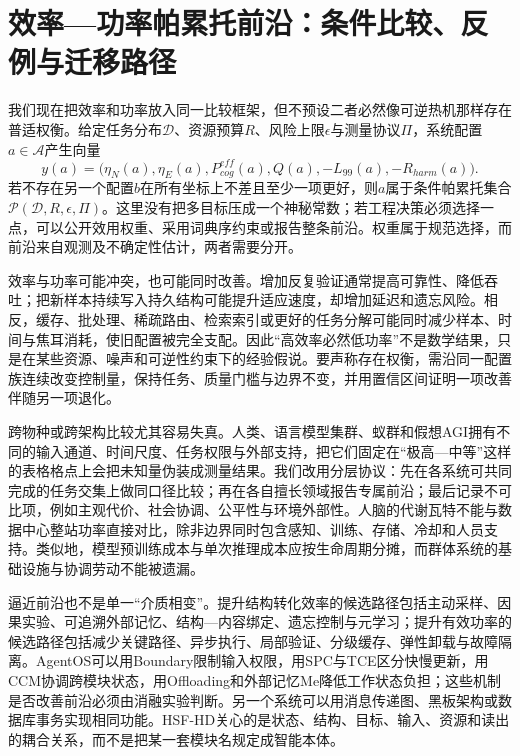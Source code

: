 \section{效率—功率帕累托前沿：条件比较、反例与迁移路径}
\label{sec:pareto_frontier}

我们现在把效率和功率放入同一比较框架，但不预设二者必然像可逆热机那样存在普适权衡。给定任务分布$\mathcal{D}$、资源预算$R$、风险上限$\epsilon$与测量协议$\Pi$，系统配置$a\in\mathcal{A}$产生向量
\begin{equation}
y(a)=\bigl(\eta_N(a),\eta_E(a),P_{cog}^{eff}(a),Q(a),-L_{99}(a),-R_{harm}(a)\bigr).
\end{equation}
若不存在另一个配置$b$在所有坐标上不差且至少一项更好，则$a$属于条件帕累托集合$\mathcal{P}(\mathcal{D},R,\epsilon,\Pi)$。这里没有把多目标压成一个神秘常数；若工程决策必须选择一点，可以公开效用权重、采用词典序约束或报告整条前沿。权重属于规范选择，而前沿来自观测及不确定性估计，两者需要分开。

效率与功率可能冲突，也可能同时改善。增加反复验证通常提高可靠性、降低吞吐；把新样本持续写入持久结构可能提升适应速度，却增加延迟和遗忘风险。相反，缓存、批处理、稀疏路由、检索索引或更好的任务分解可能同时减少样本、时间与焦耳消耗，使旧配置被完全支配。因此“高效率必然低功率”不是数学结果，只是在某些资源、噪声和可逆性约束下的经验假说。要声称存在权衡，需沿同一配置族连续改变控制量，保持任务、质量门槛与边界不变，并用置信区间证明一项改善伴随另一项退化。

跨物种或跨架构比较尤其容易失真。人类、语言模型集群、蚁群和假想AGI拥有不同的输入通道、时间尺度、任务权限与外部支持，把它们固定在“极高—中等”这样的表格格点上会把未知量伪装成测量结果。我们改用分层协议：先在各系统可共同完成的任务交集上做同口径比较；再在各自擅长领域报告专属前沿；最后记录不可比项，例如主观代价、社会协调、公平性与环境外部性。人脑的代谢瓦特不能与数据中心整站功率直接对比，除非边界同时包含感知、训练、存储、冷却和人员支持。类似地，模型预训练成本与单次推理成本应按生命周期分摊，而群体系统的基础设施与协调劳动不能被遗漏。

逼近前沿也不是单一“介质相变”。提升结构转化效率的候选路径包括主动采样、因果实验、可追溯外部记忆、结构—内容绑定、遗忘控制与元学习；提升有效功率的候选路径包括减少关键路径、异步执行、局部验证、分级缓存、弹性卸载与故障隔离。AgentOS可以用Boundary限制输入权限，用SPC与TCE区分快慢更新，用CCM协调跨模块状态，用Offloading和外部记忆Me降低工作状态负担；这些机制是否改善前沿必须由消融实验判断。另一个系统可以用消息传递图、黑板架构或数据库事务实现相同功能。HSF-HD关心的是状态、结构、目标、输入、资源和读出的耦合关系，而不是把某一套模块名规定成智能本体。

